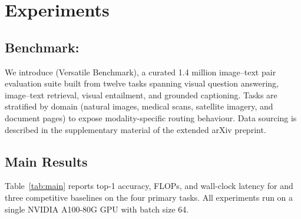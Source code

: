 
\section{Experiments}

\subsection{Benchmark: \dataset{}}

We introduce \dataset{} (Versatile Benchmark), a curated
1.4 million image--text pair evaluation suite built from
twelve tasks spanning visual question answering, image--text
retrieval, visual entailment, and grounded captioning. Tasks
are stratified by domain (natural images, medical scans,
satellite imagery, and document pages) to expose modality-specific
routing behaviour. Data sourcing is described in the supplementary
material of the extended arXiv preprint.

\subsection{Main Results}

Table~\ref{tab:main} reports top-1 accuracy, FLOPs, and
wall-clock latency for \modelname{} and three competitive baselines
on the four primary \dataset{} tasks. All experiments run on a
single NVIDIA A100-80G GPU with batch size 64.

\begin{table}[H]
  \centering
  \small
  \caption{%
    \textbf{Main results on \dataset{}.}
    FLOPs are reported for a single forward pass; latency
    is median over 1{,}000 inference calls. Best per column
    is \textbf{bolded}; \(\dagger\) marks our method.
  }
  \label{tab:main}
  \setlength{\tabcolsep}{4pt}
  \renewcommand{\arraystretch}{1.25}
\end{table}

